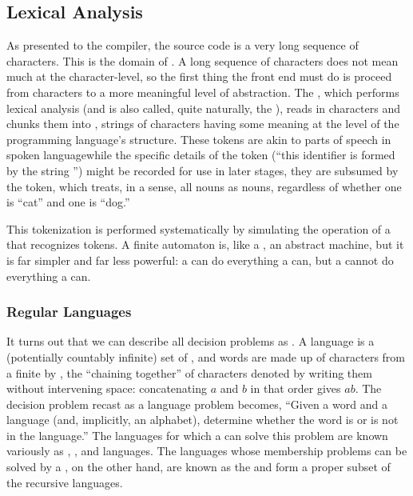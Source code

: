 \subsection{Lexical Analysis}
As presented to the compiler, the source code is a very long sequence of characters. This is the domain of . A long sequence of characters does not mean much at the character-level, so the first thing the front end must do is proceed from characters to a more meaningful level of abstraction. The , which performs lexical analysis (and is also called, quite naturally, the ), reads in characters and chunks them into , strings of characters having some meaning at the level of the programming language's structure. These tokens are akin to parts of speech in spoken language\empause while the specific details of the token (``this identifier is formed by the string '') might be recorded for use in later stages, they are subsumed by the token, which treats, in a sense, all nouns as nouns, regardless of whether one is ``cat'' and one is ``dog.''

This tokenization is performed systematically by simulating the operation of a  that recognizes tokens. A finite automaton is, like a \TM, an abstract machine, but it is far simpler and far less powerful: a \TM can do everything a \FA can, but a \FA cannot do everything a \TM can.

\subsubsection{Regular Languages}
It turns out that we can describe all decision problems as . A language is a (potentially countably infinite) set of , and words are made up of characters from a finite  by , the ``chaining together'' of characters denoted by writing them without intervening space: concatenating $a$ and $b$ in that order gives $ab$. The decision problem recast as a language problem becomes, ``Given a word and a language (and, implicitly, an alphabet), determine whether the word is or is not in the language.'' The languages for which a \TM can solve this problem are known variously as , , and  languages. The languages whose membership problems can be solved by a \FA{}, on the other hand, are known as the  and form a proper subset of the recursive languages.

